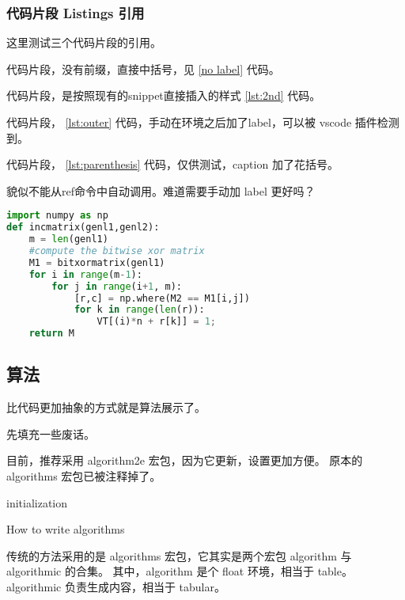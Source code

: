 \documentclass[../Main/thesis]{subfiles}
\begin{document}
\subsubsection{代码片段 Listings 引用}

这里测试三个代码片段的引用。

代码片段，没有前缀，直接中括号，见 \ref{no label} 代码。

代码片段，是按照现有的snippet直接插入的样式 \ref{lst:2nd} 代码。

代码片段， \ref{lst:outer} 代码，手动在环境之后加了label，可以被 vscode 插件检测到。

代码片段， \ref{lst:parenthesis} 代码，仅供测试，caption 加了花括号。

貌似不能从ref命令中自动调用。难道需要手动加 label 更好吗？
\begin{lstlisting}[language=Python,
  caption={Must have Parenthesis},
  label=lst:parenthesis]
import numpy as np
def incmatrix(genl1,genl2):
    m = len(genl1)
    #compute the bitwise xor matrix
    M1 = bitxormatrix(genl1)
    for i in range(m-1):
        for j in range(i+1, m):
            [r,c] = np.where(M2 == M1[i,j])
            for k in range(len(r)):
                VT[(i)*n + r[k]] = 1;
    return M
\end{lstlisting}
\subsection{算法}
\label{ssc:algo}

比代码更加抽象的方式就是算法展示了。

先填充一些废话。\zhlipsum[7]

目前，推荐采用 algorithm2e 宏包，因为它更新，设置更加方便。
原本的 algorithms 宏包已被注释掉了。

\begin{algorithm}[htbp]
  \SetAlgoLined
  initialization\;
  \caption{How to write algorithms}
\end{algorithm}

传统的方法采用的是 algorithms 宏包，它其实是两个宏包 algorithm 与 algorithmic 的合集。
其中，algorithm 是个 float 环境，相当于 table。
algorithmic 负责生成内容，相当于 tabular。
\end{document}
